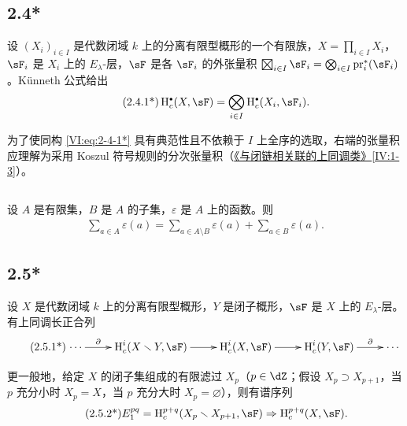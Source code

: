 \subsection*{2.4*}\label{VI:2-4*}

设 $(X_i)_{i\in I}$ 是代数闭域 $k$ 上的分离有限型概形的一个有限族，$X=\prod_{i\in I} X_i$，$\sF_i$ 是 $X_i$ 上的 $E_\lambda$-层，$\sF$ 是各 $\sF_i$ 的外张量积 $\bigboxtimes_{i\in I}\sF_i = \bigotimes_{i\in I} \pr_i^\ast(\sF_i)$。K\"unneth 公式给出
\begin{align*}\tag{2.4.1*}\label{VI:eq:2-4-1*}
  \h_c^\bullet(X,\sF) = \bigotimes_{i\in I} \h_c^\bullet(X_i,\sF_i) \text{.}
\end{align*}

为了使同构 \eqref{VI:eq:2-4-1*} 具有典范性且不依赖于 $I$ 上全序的选取，右端的张量积应理解为采用 Koszul 符号规则的分次张量积（\hyperref[IV]{《与闭链相关联的上同调类》}\ref{IV:1-3}）。

\subsection{}\label{VI:2-5}

设 $A$ 是有限集，$B$ 是 $A$ 的子集，$\varepsilon$ 是 $A$ 上的函数。则
\begin{align*}\tag{2.5.1}\label{VI:2-5-1}
  \sum_{a\in A} \varepsilon(a) = \sum_{a\in A\setminus B}\varepsilon(a) + \sum_{a\in B} \varepsilon(a) \text{.}
\end{align*}

\subsection*{2.5*}\label{VI:2-5*}

设 $X$ 是代数闭域 $k$ 上的分离有限型概形，$Y$ 是闭子概形，$\sF$ 是 $X$ 上的 $E_\lambda$-层。有上同调长正合列
\begin{align*}\tag{2.5.1*}\label{VI:eq:2-5-1*}
\xymatrix{
  \cdots \ar[r]^-\partial
    & \h_c^i(X\setminus Y,\sF) \ar[r]
    & \h_c^i(X,\sF) \ar[r]
    & \h_c^i(Y,\sF) \ar[r]^-\partial
    & \cdots
}
\end{align*}

更一般地，给定 $X$ 的闭子集组成的有限滤过 $X_p$（$p\in \dZ$；假设 $X_p\supset X_{p+1}$，当 $p$ 充分小时 $X_p=X$，当 $p$ 充分大时 $X_p=\varnothing$），则有谱序列
\begin{align*}\tag{2.5.2*}\label{VI:eq:2-5-2*}
  E_1^{p q} = \h_c^{p+q}(X_p\setminus X_{p+1},\sF) \Rightarrow \h_c^{p+q}(X,\sF) \text{.}
\end{align*}


